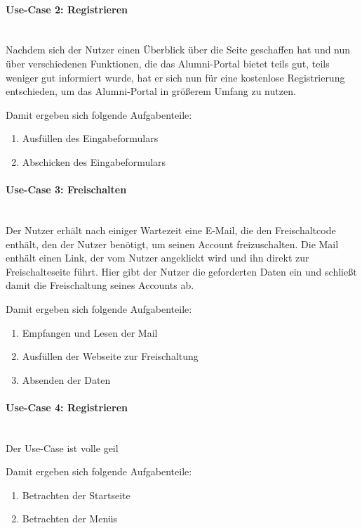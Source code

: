 \paragraph{Use-Case 2: Registrieren}\quad\\
Nachdem sich der Nutzer einen Überblick über die Seite geschaffen hat und nun über verschiedenen Funktionen, die das Alumni-Portal bietet teils gut, teils weniger gut informiert wurde, hat er sich nun für eine kostenlose Registrierung entschieden, um das Alumni-Portal in größerem Umfang zu nutzen.

Damit ergeben sich folgende Aufgabenteile:
\begin{enumerate}
		\item Ausfüllen des Eingabeformulars
		\item Abschicken des Eingabeformulars
\end{enumerate}

\paragraph{Use-Case 3: Freischalten}\quad\\
Der Nutzer erhält nach einiger Wartezeit eine E\hbox{-}Mail, die den Freischaltcode enthält, den der Nutzer benötigt, um seinen Account freizuschalten. Die Mail enthält einen Link, der vom Nutzer angeklickt wird und ihn direkt zur Freischalteseite führt. Hier gibt der Nutzer die geforderten Daten ein und schließt damit die Freischaltung seines Accounts ab.

Damit ergeben sich folgende Aufgabenteile:
\begin{enumerate}
		\item Empfangen und Lesen der Mail
		\item Ausfüllen der Webseite zur Freischaltung
		\item Absenden der Daten
\end{enumerate}


\paragraph{Use-Case 4: Registrieren}\quad\\
Der Use-Case ist volle geil

Damit ergeben sich folgende Aufgabenteile:
\begin{enumerate}

		\item Betrachten der Startseite
		\item Betrachten der Menüs
\end{enumerate}



